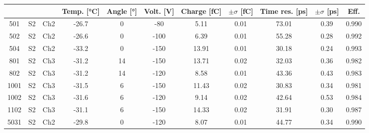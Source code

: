 \begin{tabular}{ccccccccccc}
\toprule
 &  &  & Temp. [°C] & Angle [°] & Volt. [V] & Charge [fC] & \(\pm\sigma\) [fC] & Time res. [ps] & \(\pm\sigma\) [ps] & Eff. \\
\midrule
501 & S2 & Ch2 & -26.7 & 0 & -80 & 5.11 & 0.01 & 73.01 & 0.39 & 0.990 \\
502 & S2 & Ch2 & -26.6 & 0 & -100 & 6.39 & 0.01 & 55.28 & 0.28 & 0.992 \\
504 & S2 & Ch2 & -33.2 & 0 & -150 & 13.91 & 0.01 & 30.18 & 0.24 & 0.993 \\
801 & S2 & Ch3 & -31.2 & 14 & -150 & 13.71 & 0.02 & 32.03 & 0.36 & 0.982 \\
802 & S2 & Ch3 & -31.2 & 14 & -120 & 8.58 & 0.01 & 43.36 & 0.43 & 0.983 \\
1001 & S2 & Ch3 & -31.5 & 6 & -150 & 11.43 & 0.02 & 30.83 & 0.34 & 0.981 \\
1002 & S2 & Ch3 & -31.6 & 6 & -120 & 9.14 & 0.02 & 42.64 & 0.53 & 0.984 \\
1102 & S2 & Ch3 & -31.1 & 6 & -150 & 14.33 & 0.02 & 31.91 & 0.30 & 0.987 \\
5031 & S2 & Ch2 & -29.8 & 0 & -120 & 8.07 & 0.01 & 44.77 & 0.34 & 0.990 \\
\bottomrule
\end{tabular}
